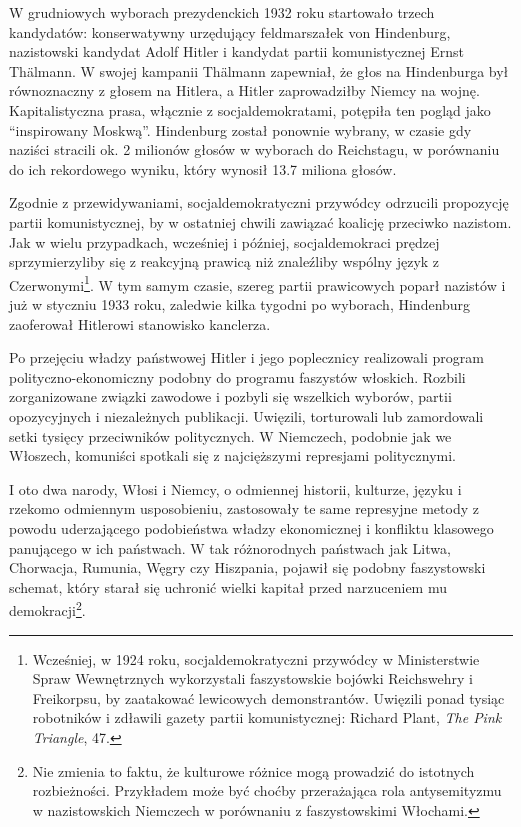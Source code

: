 \documentclass[12pt]{book}
\begin{document}
W grudniowych wyborach prezydenckich 1932 roku startowało trzech kandydatów: konserwatywny urzędujący feldmarszałek von Hindenburg, nazistowski kandydat Adolf Hitler i kandydat partii komunistycznej Ernst Thälmann. W swojej kampanii Thälmann zapewniał, że głos na Hindenburga był równoznaczny z głosem na Hitlera, a Hitler zaprowadziłby Niemcy na wojnę. Kapitalistyczna prasa, włącznie z socjaldemokratami, potępiła ten pogląd jako ``inspirowany Moskwą''. Hindenburg został ponownie wybrany, w czasie gdy naziści stracili ok. 2 milionów głosów w wyborach do Reichstagu, w porównaniu do ich rekordowego wyniku, który wynosił 13.7 miliona głosów.

Zgodnie z przewidywaniami, socjaldemokratyczni przywódcy odrzucili propozycję partii komunistycznej, by w ostatniej chwili zawiązać koalicję przeciwko nazistom. Jak w wielu przypadkach, wcześniej i później, socjaldemokraci prędzej sprzymierzyliby się z reakcyjną prawicą niż znaleźliby wspólny język z Czerwonymi\footnote{Wcześniej, w 1924 roku, socjaldemokratyczni przywódcy w Ministerstwie Spraw Wewnętrznych wykorzystali faszystowskie bojówki Reichswehry i Freikorpsu, by zaatakować lewicowych demonstrantów. Uwięzili ponad tysiąc robotników i zdławili gazety partii komunistycznej: Richard Plant, \textit{The Pink Triangle}, 47.}. W tym samym czasie, szereg partii prawicowych poparł nazistów i już w styczniu 1933 roku, zaledwie kilka tygodni po wyborach, Hindenburg zaoferował Hitlerowi stanowisko kanclerza.

Po przejęciu władzy państwowej Hitler i jego poplecznicy realizowali program polityczno-ekonomiczny podobny do programu faszystów włoskich. Rozbili zorganizowane związki zawodowe i pozbyli się wszelkich wyborów, partii opozycyjnych i niezależnych publikacji. Uwięzili, torturowali lub zamordowali setki tysięcy przeciwników politycznych. W Niemczech, podobnie jak we Włoszech, komuniści spotkali się z najcięższymi represjami politycznymi.

I oto dwa narody, Włosi i Niemcy, o odmiennej historii, kulturze, języku i rzekomo odmiennym usposobieniu, zastosowały te same represyjne metody z powodu uderzającego podobieństwa władzy ekonomicznej i konfliktu klasowego panującego w ich państwach. W tak różnorodnych państwach jak Litwa, Chorwacja, Rumunia, Węgry czy Hiszpania, pojawił się podobny faszystowski schemat, który starał się uchronić  wielki kapitał przed narzuceniem mu demokracji\footnote{Nie zmienia to faktu, że kulturowe różnice mogą prowadzić do istotnych rozbieżności. Przykładem może być choćby przerażająca rola antysemityzmu w nazistowskich Niemczech w porównaniu z faszystowskimi Włochami.}.
\end{document}
